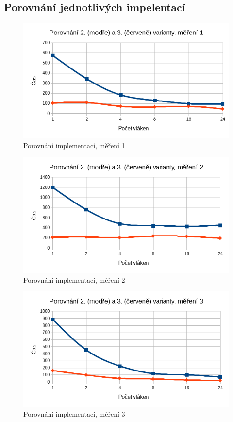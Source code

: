 \documentclass[12pt]{article}
\begin{document}
\subsection{Porovnání jednotlivých impelentací}

\begin{figure}[h]
  \begin{center}
      \includegraphics[width=12cm]{images/vs1.png}	
    \caption{Porovnání implementací, měření 1} 
  \end{center}
\end{figure}

\begin{figure}[h]
  \begin{center}
      \includegraphics[width=12cm]{images/vs2.png}	
    \caption{Porovnání implementací, měření 2}
  \end{center}
\end{figure}

\begin{figure}[h]
  \begin{center}
      \includegraphics[width=12cm]{images/vs3.png}	
    \caption{Porovnání implementací, měření 3}
  \end{center}
\end{figure}
\end{document}
